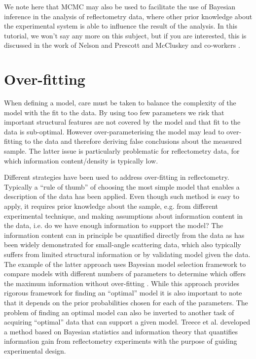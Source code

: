 \documentclass[
 reprint,
 superscriptaddress,
 amsmath,amssymb,
 aps,
]{revtex4-1}
\begin{document}
We note here that MCMC may also be used to facilitate the use of Bayesian inference in the analysis of reflectometry data, where other prior knowledge about the experimental system is able to influence the result of the analysis.
In this tutorial, we won't say any more on this subject, but if you are interested, this is discussed in the work of Nelson and Prescott \cite{nelson_refnx_2019} and McCluskey and co-workers \cite{mccluskey_general_2020}.

\section{Over-fitting}

When defining a model, care must be taken to balance the complexity of the model with the fit to the data.
By using too few parameters we risk that important structural features are not covered by the model and that fit to the data is sub-optimal. 
However over-parameterising the model may lead to over-fitting to the data and therefore deriving false conclusions about the measured sample. 
The latter issue is particularly problematic for reflectometry data, for which information content/density is typically low. 

Different strategies have been used to address over-fitting in reflectometry. 
Typically a ``rule of thumb'' of choosing the most simple model that enables a description of the data has been applied. 
Even though such method is easy to apply, it requires prior knowledge about the sample, e.g. from different experimental technique, and making assumptions about information content in the data, i.e. do we have enough information to support the model?
The information content can in principle be quantified directly from the data as has been widely demonstrated for small-angle scattering data, which also typically suffers from limited structural information \cite{Larsen_2018} or by validating model given the data. %
The example of the latter approach uses Bayesian model selection framework to compare models with different numbers of parameters to determine which offers the maximum information without over-fitting \cite{hughes_model_selection_2019, mccluskey_general_2020}. 
While this approach provides rigorous framework for finding an ``optimal'' model it is also important to note that it depends on the prior probabilities chosen for each of the parameters.
The problem of finding an optimal model can also be inverted to another task of acquiring ``optimal'' data that can support a given model. 
Treece et al. \cite{Treece_2019} developed a method based on Bayesian statistics and information theory that quantifies information gain from reflectometry experiments with the purpose of guiding experimental design. 
\end{document}
